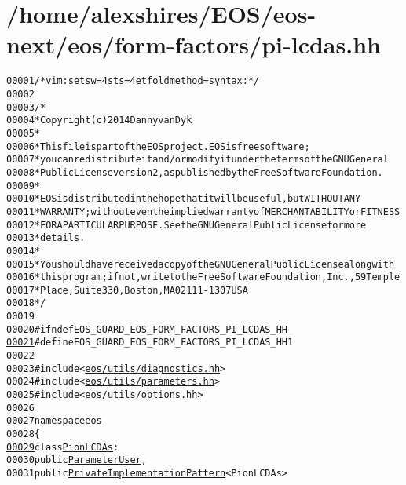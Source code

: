 \hypertarget{pi-lcdas_8hh_source}{
\section{/home/alexshires/EOS/eos-\/next/eos/form-\/factors/pi-\/lcdas.hh}
}


\begin{footnotesize}\begin{alltt}
00001 \textcolor{comment}{/* vim: set sw=4 sts=4 et foldmethod=syntax : */}
00002 
00003 \textcolor{comment}{/*}
00004 \textcolor{comment}{ * Copyright (c) 2014 Danny van Dyk}
00005 \textcolor{comment}{ *}
00006 \textcolor{comment}{ * This file is part of the EOS project. EOS is free software;}
00007 \textcolor{comment}{ * you can redistribute it and/or modify it under the terms of the GNU General}
00008 \textcolor{comment}{ * Public License version 2, as published by the Free Software Foundation.}
00009 \textcolor{comment}{ *}
00010 \textcolor{comment}{ * EOS is distributed in the hope that it will be useful, but WITHOUT ANY}
00011 \textcolor{comment}{ * WARRANTY; without even the implied warranty of MERCHANTABILITY or FITNESS}
00012 \textcolor{comment}{ * FOR A PARTICULAR PURPOSE.  See the GNU General Public License for more}
00013 \textcolor{comment}{ * details.}
00014 \textcolor{comment}{ *}
00015 \textcolor{comment}{ * You should have received a copy of the GNU General Public License along with}
00016 \textcolor{comment}{ * this program; if not, write to the Free Software Foundation, Inc., 59 Temple}
00017 \textcolor{comment}{ * Place, Suite 330, Boston, MA  02111-1307  USA}
00018 \textcolor{comment}{ */}
00019 
00020 \textcolor{preprocessor}{#ifndef EOS\_GUARD\_EOS\_FORM\_FACTORS\_PI\_LCDAS\_HH}
\hypertarget{pi-lcdas_8hh_source_l00021}{}\hyperlink{pi-lcdas_8hh_abfa4ecec276f0fd748f8596f3b75e3d3}{00021} \textcolor{preprocessor}{}\textcolor{preprocessor}{#define EOS\_GUARD\_EOS\_FORM\_FACTORS\_PI\_LCDAS\_HH 1}
00022 \textcolor{preprocessor}{}
00023 \textcolor{preprocessor}{#include <\hyperlink{diagnostics_8hh}{eos/utils/diagnostics.hh}>}
00024 \textcolor{preprocessor}{#include <\hyperlink{parameters_8hh}{eos/utils/parameters.hh}>}
00025 \textcolor{preprocessor}{#include <\hyperlink{options_8hh}{eos/utils/options.hh}>}
00026 
00027 \textcolor{keyword}{namespace }eos
00028 \{
\hypertarget{pi-lcdas_8hh_source_l00029}{}\hyperlink{classeos_1_1PionLCDAs}{00029}     \textcolor{keyword}{class }\hyperlink{classeos_1_1PionLCDAs}{PionLCDAs} :
00030         \textcolor{keyword}{public} \hyperlink{classeos_1_1ParameterUser}{ParameterUser},
00031         \textcolor{keyword}{public} \hyperlink{classeos_1_1PrivateImplementationPattern}{PrivateImplementationPattern}<PionLCDAs>

\end{alltt}
\end{footnotesize}
